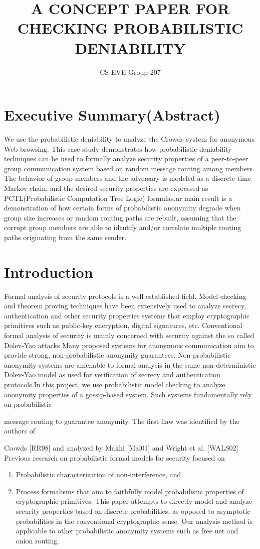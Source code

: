 \documentclass{article}
\begin{document}
\title{A CONCEPT PAPER FOR CHECKING PROBABILISTIC DENIABILITY}
\author{CS EVE Group 207 }
\maketitle
\section{Executive Summary(Abstract)}
We use the probabilistic deniability to analyze the Crowds system for anonymous
Web browsing. This case study demonstrates how probabilistic deniability
techniques can be used to formally analyze security properties of a peer-to-peer
group communication system based on random message routing among members. The
behavior of group members and the adversary is modeled as a discrete-time Markov
chain, and the desired security properties are expressed as PCTL(Probabilistic Computation Tree Logic) formulas.ur main result is a demonstration of how certain
forms of probabilistic anonymity degrade when group size increases or random
routing paths are rebuilt, assuming that the corrupt group
members are able to identify and/or correlate multiple routing paths
originating from the same sender.
\section{Introduction}
Formal analysis of security protocols is a well-established field. Model
checking and theorem proving techniques have been extensively used to
analyze secrecy, authentication and other security properties systems that employ
cryptographic primitives such as public-key encryption, digital signatures, etc.
Conventional formal analysis of security is mainly concerned with security
 against the so called Dolev-Yao attacks Many proposed
systems for anonymous communication aim to provide strong, non-probabilistic anonymity guarantees. Non-probabilistic anonymity systems are
amenable to formal analysis in the same non-deterministic Dolev-Yao model as used
for verification of secrecy and authentication protocols.In this
project, we use probabilistic model checking to analyze anonymity
properties of a gossip-based system. Such systems fundamentally rely on
probabilistic

message routing to guarantee anonymity. The first flaw was identified by the
authors of

Crowds [RR98] and analyzed by Makhi [Mal01] and Wright et al.
[WALS02] Previous research on probabilistic formal models for security
focused on
\begin{enumerate}
\item Probabilistic characterization of non-interference, and
\item Process formalisms that aim to faithfully model probabilistic
properties of cryptographic primitives. This paper attempts to directly model
and analyze security properties based on discrete probabilities, as
opposed to asymptotic probabilities in the conventional cryptographic sense. Our
analysis method is applicable to other probabilistic anonymity systems
such as free net and onion routing.
\end{enumerate}
\end{document}
